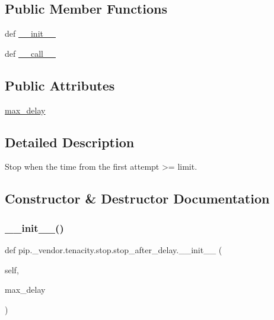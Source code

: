 \subsection*{Public Member Functions}
\begin{DoxyCompactItemize}
\item 
def \hyperlink{classpip_1_1__vendor_1_1tenacity_1_1stop_1_1stop__after__delay_a17b663a8095ea3a6715c131c82f79358}{\+\_\+\+\_\+init\+\_\+\+\_\+}
\item 
def \hyperlink{classpip_1_1__vendor_1_1tenacity_1_1stop_1_1stop__after__delay_abab7e4ca3390558d099a90ad9ade3cf8}{\+\_\+\+\_\+call\+\_\+\+\_\+}
\end{DoxyCompactItemize}
\subsection*{Public Attributes}
\begin{DoxyCompactItemize}
\item 
\hyperlink{classpip_1_1__vendor_1_1tenacity_1_1stop_1_1stop__after__delay_a488f0354e70c9060fa51020587e2cee3}{max\+\_\+delay}
\end{DoxyCompactItemize}


\subsection{Detailed Description}
\begin{DoxyVerb}Stop when the time from the first attempt >= limit.\end{DoxyVerb}
 

\subsection{Constructor \& Destructor Documentation}
\mbox{\label{classpip_1_1__vendor_1_1tenacity_1_1stop_1_1stop__after__delay_a17b663a8095ea3a6715c131c82f79358}} 
\subsubsection{\texorpdfstring{\+\_\+\+\_\+init\+\_\+\+\_\+()}{\_\_init\_\_()}}
{\footnotesize\ttfamily def pip.\+\_\+vendor.\+tenacity.\+stop.\+stop\+\_\+after\+\_\+delay.\+\_\+\+\_\+init\+\_\+\+\_\+ (\begin{DoxyParamCaption}\item[{}]{self,  }\item[{}]{max\+\_\+delay }\end{DoxyParamCaption})}



